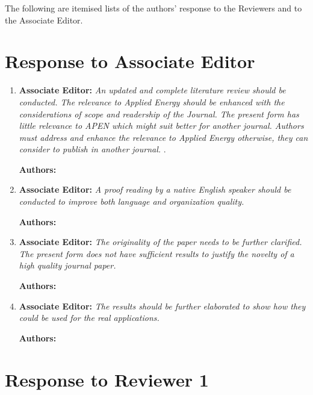 \documentclass{article}
\begin{document}
The following are itemised lists of the authors' response to the Reviewers and to the Associate Editor.

\section{Response to Associate Editor}

\begin{enumerate}
	\item \textbf{Associate Editor:} \textit{An updated and complete literature review should be conducted. The relevance to Applied Energy should be enhanced with the considerations of scope and readership of the Journal.  The present form has little relevance to APEN which might suit better for another journal. Authors must address and enhance the relevance to Applied Energy otherwise, they can consider to publish in another journal. }.
	
	\textbf{Authors:}
	
	\item \textbf{Associate Editor:} \textit{A proof reading by a native English speaker should be conducted to improve both language and organization quality. }
	
	\textbf{Authors:} 
	
	\item \textbf{Associate Editor:} \textit{The originality of the paper needs to be further clarified. The present form does not have sufficient results to justify the novelty of a high quality journal paper. }
	
	\textbf{Authors:} 
	
	\item \textbf{Associate Editor:} \textit{The results should be further elaborated to show how they could be used for the real applications.}
	
	\textbf{Authors:} 
	
\end{enumerate}

\section{Response to Reviewer 1}
\end{document}
